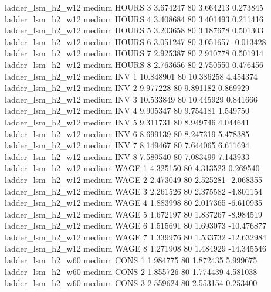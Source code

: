   ladder_lsm_h2_w12     medium    HOURS                 3  3.674247 80       3.664213           0.273845
  ladder_lsm_h2_w12     medium    HOURS                 4  3.408684 80       3.401493           0.211416
  ladder_lsm_h2_w12     medium    HOURS                 5  3.203658 80       3.187678           0.501303
  ladder_lsm_h2_w12     medium    HOURS                 6  3.051247 80       3.051657          -0.013428
  ladder_lsm_h2_w12     medium    HOURS                 7  2.925387 80       2.910778           0.501914
  ladder_lsm_h2_w12     medium    HOURS                 8  2.763656 80       2.750550           0.476456
  ladder_lsm_h2_w12     medium      INV                 1 10.848901 80      10.386258           4.454374
  ladder_lsm_h2_w12     medium      INV                 2  9.977228 80       9.891182           0.869929
  ladder_lsm_h2_w12     medium      INV                 3 10.533849 80      10.445929           0.841666
  ladder_lsm_h2_w12     medium      INV                 4  9.905347 80       9.754181           1.549750
  ladder_lsm_h2_w12     medium      INV                 5  9.311731 80       8.949746           4.044641
  ladder_lsm_h2_w12     medium      INV                 6  8.699139 80       8.247319           5.478385
  ladder_lsm_h2_w12     medium      INV                 7  8.149467 80       7.644065           6.611694
  ladder_lsm_h2_w12     medium      INV                 8  7.589540 80       7.083499           7.143933
  ladder_lsm_h2_w12     medium     WAGE                 1  4.325150 80       4.313523           0.269540
  ladder_lsm_h2_w12     medium     WAGE                 2  2.473049 80       2.525281          -2.068355
  ladder_lsm_h2_w12     medium     WAGE                 3  2.261526 80       2.375582          -4.801154
  ladder_lsm_h2_w12     medium     WAGE                 4  1.883998 80       2.017365          -6.610935
  ladder_lsm_h2_w12     medium     WAGE                 5  1.672197 80       1.837267          -8.984519
  ladder_lsm_h2_w12     medium     WAGE                 6  1.515691 80       1.693073         -10.476877
  ladder_lsm_h2_w12     medium     WAGE                 7  1.339976 80       1.533732         -12.632984
  ladder_lsm_h2_w12     medium     WAGE                 8  1.271908 80       1.484929         -14.345546
  ladder_lsm_h2_w60     medium     CONS                 1  1.984775 80       1.872435           5.999675
  ladder_lsm_h2_w60     medium     CONS                 2  1.855726 80       1.774439           4.581038
  ladder_lsm_h2_w60     medium     CONS                 3  2.559624 80       2.553154           0.253400
